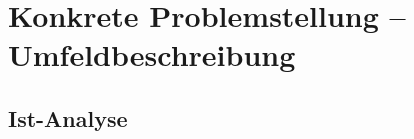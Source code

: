\chapter{Konkrete Problemstellung -- Umfeldbeschreibung}
\label{sec:problemdescription}

\section{Ist-Analyse}

\fi\makeatother